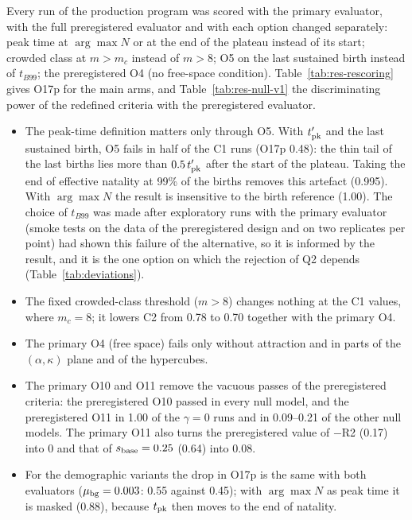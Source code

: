 Every run of the production program was scored with the primary evaluator, with the full preregistered evaluator and with
each option changed separately: peak time at $\arg\max N$ or at the end of the plateau instead of its start; crowded
class at $m>m_c$ instead of $m>8$; O5 on the last sustained birth instead of $t_{B99}$; the preregistered O4 (no
free-space condition). Table~\ref{tab:res-rescoring} gives O17p for the main arms, and Table~\ref{tab:res-null-v1}
the discriminating power of the redefined criteria with the preregistered evaluator.
\begin{itemize}
  \item The peak-time definition matters only through O5. With $t'_{\rm pk}$ and the last sustained birth, O5 fails
    in half of the \textsf{C1} runs (O17p 0.48): the thin tail of the last births lies more than $0.5\,t'_{\rm pk}$
    after the start of the plateau. Taking the end of effective natality at 99\% of the births removes this
    artefact (0.995). With $\arg\max N$ the result is insensitive to the birth reference (1.00). The choice of
    $t_{B99}$ was made after exploratory runs with the primary evaluator (smoke tests on the data of the preregistered design and on two
    replicates per point) had shown this failure of the alternative, so it is informed by the result, and it is the
    one option on which the rejection of Q2 depends (Table~\ref{tab:deviations}).
  \item The fixed crowded-class threshold ($m>8$) changes nothing at the \textsf{C1} values, where $m_c=8$; it
    lowers \textsf{C2} from 0.78 to 0.70 together with the primary O4.
  \item The primary O4 (free space) fails only without attraction and in parts of the $(\alpha,\kappa)$ plane and of
    the hypercubes.
  \item The primary O10 and O11 remove the vacuous passes of the preregistered criteria: the preregistered O10
    passed in every null model, and the preregistered O11 in 1.00 of the $\gamma=0$ runs and in 0.09--0.21 of the
    other null models. The primary O11 also turns the preregistered value of $-$R2 (0.17) into 0 and that of $s_{\rm base}=0.25$ (0.64) into
    0.08.
  \item For the demographic variants the drop in O17p is the same with both evaluators ($\mu_{\rm bg}=0.003$: 0.55
    against 0.45); with $\arg\max N$ as peak time it is masked (0.88), because $t_{\rm pk}$ then moves to the end of
    natality.
\end{itemize}

